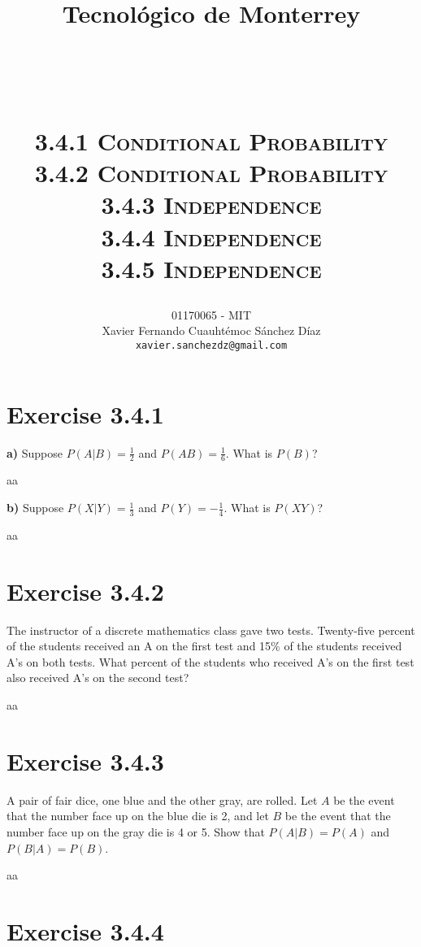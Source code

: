 \documentclass[titlepage, letterpaper, fleqn]{article}
\title{
\vspace{1in}
\textbf{Tecnológico de Monterrey} \\
\vspace{0.5in}
\textmd{\mahclass} \\
\large{\textit{\mahteacher}} \\
\vspace{0.5in}
\textsc{\mahtitle}\\
\textsc{3.4.1 Conditional Probability}\\
\textsc{3.4.2 Conditional Probability}\\
\textsc{3.4.3 Independence}\\
\textsc{3.4.4 Independence}\\
\textsc{3.4.5 Independence}\\
\author{01170065  - MIT \\
Xavier Fernando Cuauhtémoc Sánchez Díaz \\
\texttt{xavier.sanchezdz@gmail.com}}
\date{\mahdate}
}
\newcommand{\spacepls}{\vspace{5mm}}
\begin{document}
\begin{titlepage}
\maketitle
\end{titlepage}

%
%

\section{Exercise 3.4.1}

{\large \textbf{a)} Suppose \(P(A \vert B) = \frac{1}{2}\) and \(P(AB) = \frac{1}{6}\). What is \(P(B)\)?}

\spacepls

aa

{\large \textbf{b)} Suppose \(P(X \vert Y) = \frac{1}{3}\) and \(P(Y) =- \frac{1}{4}\). What is \(P(XY)\)?}

\spacepls

aa

\section{Exercise 3.4.2}

{\large The instructor of a discrete mathematics class gave two tests. Twenty-five percent of the students received an A on the first test and 15\% of the students received A's on both tests.
What percent of the students who received A's on the first test also received A's on the second test?}

\spacepls

aa

\section{Exercise 3.4.3}

{\large A pair of fair dice, one  blue and the other gray, are rolled.
Let \(A\) be the event that the number face up on the blue die is 2,
and let \(B\) be the event that the number face up on the gray die is 4 or 5.
Show that \(P(A \vert B) = P(A)\) and \(P(B \vert A) = P(B)\)}.

\spacepls

aa

\section{Exercise 3.4.4}
\end{document}
